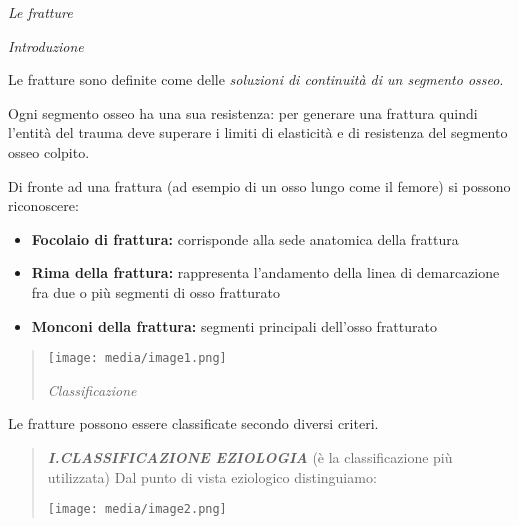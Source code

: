 \documentclass[]{article}
\date{}
\begin{document}
\emph{Le fratture}

\emph{Introduzione}

Le fratture sono definite come delle \emph{soluzioni di continuità di un
segmento osseo}.

Ogni segmento osseo ha una sua resistenza: per generare una frattura
quindi l'entità del trauma deve superare i limiti di elasticità e di
resistenza del segmento osseo colpito.

Di fronte ad una frattura (ad esempio di un osso lungo come il femore)
si possono riconoscere:

\begin{itemize}
\item
  \textbf{Focolaio di frattura:} corrisponde alla sede anatomica della
  frattura
\item
  \textbf{Rima della frattura:} rappresenta l'andamento della linea di
  demarcazione fra due o più segmenti di osso fratturato
\item
  \textbf{Monconi della frattura:} segmenti principali dell'osso
  fratturato
\end{itemize}

\begin{quote}
\texttt{[image: media/image1.png]}

\emph{Classificazione}
\end{quote}

Le fratture possono essere classificate secondo diversi criteri.

\begin{quote}
\textbf{\emph{I.CLASSIFICAZIONE EZIOLOGIA}} (è la classificazione più
utilizzata) Dal punto di vista eziologico distinguiamo:

\texttt{[image: media/image2.png]}
\end{quote}
\end{document}
